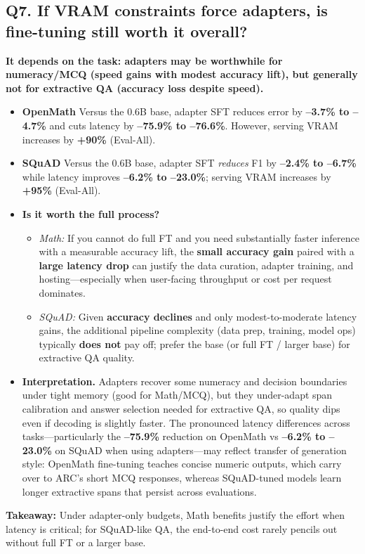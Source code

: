 \documentclass[11pt,a4paper]{article}
\begin{document}
\subsection*{Q7. If VRAM constraints force adapters, is fine-tuning still worth it overall?}
\textbf{It depends on the task: adapters may be worthwhile for numeracy/MCQ (speed gains with modest accuracy lift), but generally not for extractive QA (accuracy loss despite speed).}
\begin{itemize}
  \item \textbf{OpenMath} Versus the 0.6B base, adapter SFT reduces error by \textbf{--3.7\% to --4.7\%} and cuts latency by \textbf{--75.9\% to --76.6\%}. However, serving VRAM increases by \textbf{+90\%} (Eval-All).
  \item \textbf{SQuAD} Versus the 0.6B base, adapter SFT \emph{reduces} F1 by \textbf{--2.4\% to --6.7\%} while latency improves \textbf{--6.2\% to --23.0\%}; serving VRAM increases by \textbf{+95\%} (Eval-All).
  \item \textbf{Is it worth the full process?} 
  \begin{itemize}
    \item \emph{Math:} If you cannot do full FT and you need substantially faster inference with a measurable accuracy lift, the \textbf{small accuracy gain} paired with a \textbf{large latency drop} can justify the data curation, adapter training, and hosting—especially when user-facing throughput or cost per request dominates. 
    \item \emph{SQuAD:} Given \textbf{accuracy declines} and only modest-to-moderate latency gains, the additional pipeline complexity (data prep, training, model ops) typically \textbf{does not} pay off; prefer the base (or full FT / larger base) for extractive QA quality.
  \end{itemize}
  \item \textbf{Interpretation.} Adapters recover some numeracy and decision boundaries under tight memory (good for Math/MCQ), but they under-adapt span calibration and answer selection needed for extractive QA, so quality dips even if decoding is slightly faster. The pronounced latency differences across tasks—particularly the \textbf{--75.9\%} reduction on OpenMath vs \textbf{--6.2\% to --23.0\%} on SQuAD when using adapters—may reflect transfer of generation style: OpenMath fine-tuning teaches concise numeric outputs, which carry over to ARC's short MCQ responses, whereas SQuAD-tuned models learn longer extractive spans that persist across evaluations.
\end{itemize}
\textbf{Takeaway:} Under adapter-only budgets, Math benefits justify the effort when latency is critical; for SQuAD-like QA, the end-to-end cost rarely pencils out without full FT or a larger base.
\end{document}
